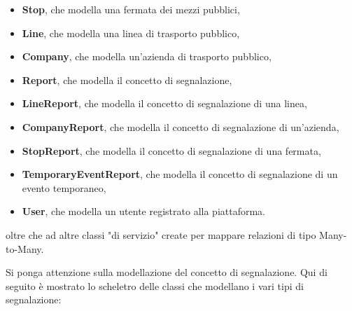         \begin{itemize}
            \item \textbf{Stop}, che modella una fermata dei mezzi pubblici,
            \item \textbf{Line}, che modella una linea di trasporto pubblico,
            \item \textbf{Company}, che modella un'azienda di trasporto pubblico,
            \item \textbf{Report}, che modella il concetto di segnalazione,
            \item \textbf{LineReport}, che modella il concetto di segnalazione di una linea,
            \item \textbf{CompanyReport}, che modella il concetto di segnalazione di un'azienda,
            \item \textbf{StopReport}, che modella il concetto di segnalazione di una fermata,
            \item \textbf{TemporaryEventReport}, che modella il concetto di segnalazione di un evento temporaneo,
            \item \textbf{User}, che modella un utente registrato alla piattaforma.
        \end{itemize}

        oltre che ad altre classi "di servizio" create per mappare relazioni di tipo Many-to-Many.

        Si ponga attenzione sulla modellazione del concetto di segnalazione. Qui di seguito è mostrato lo scheletro delle classi che modellano i vari tipi di segnalazione:
        
